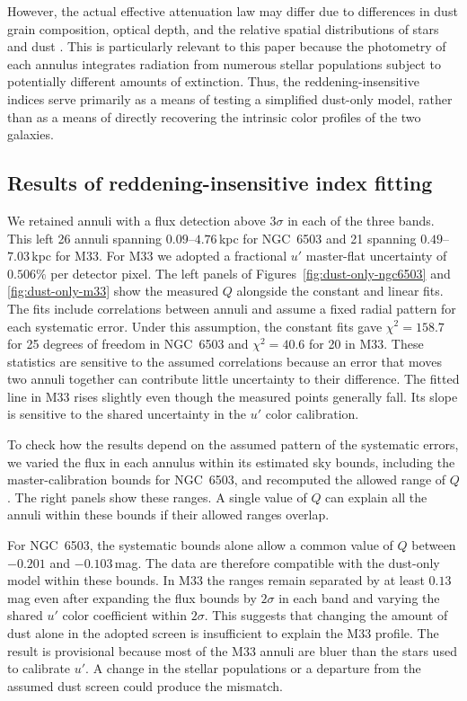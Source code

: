 However, the actual effective attenuation law may differ due to differences in dust grain composition, optical depth, and the relative spatial distributions of stars and dust \cite{SalimNarayanan2020}. This is particularly relevant to this paper because the photometry of each annulus integrates radiation from numerous stellar populations subject to potentially different amounts of extinction. Thus, the reddening-insensitive indices serve primarily as a means of testing a simplified dust-only model, rather than as a means of directly recovering the intrinsic color profiles of the two galaxies.

\subsection{Results of reddening-insensitive index fitting}
\label{sec:dust-only-results}

We retained annuli with a flux detection above $3\sigma$ in each of the three bands. This left 26 annuli spanning $0.09$--$4.76$\,kpc for NGC~6503 and 21 spanning $0.49$--$7.03$\,kpc for M33. For M33 we adopted a fractional $u'$ master-flat uncertainty of $0.506\%$ per detector pixel. The left panels of Figures~\ref{fig:dust-only-ngc6503} and \ref{fig:dust-only-m33} show the measured $Q$ alongside the constant and linear fits. The fits include correlations between annuli and assume a fixed radial pattern for each systematic error. Under this assumption, the constant fits gave $\chi^2=158.7$ for 25 degrees of freedom in NGC~6503 and $\chi^2=40.6$ for 20 in M33. These statistics are sensitive to the assumed correlations because an error that moves two annuli together can contribute little uncertainty to their difference. The fitted line in M33 rises slightly even though the measured points generally fall. Its slope is sensitive to the shared uncertainty in the $u'$ color calibration.

To check how the results depend on the assumed pattern of the systematic errors, we varied the flux in each annulus within its estimated sky bounds, including the master-calibration bounds for NGC~6503, and recomputed the allowed range of $Q$. The right panels show these ranges. A single value of $Q$ can explain all the annuli within these bounds if their allowed ranges overlap.

For NGC~6503, the systematic bounds alone allow a common value of $Q$ between $-0.201$ and $-0.103$\,mag. The data are therefore compatible with the dust-only model within these bounds. In M33 the ranges remain separated by at least $0.13$\,mag even after expanding the flux bounds by $2\sigma$ in each band and varying the shared $u'$ color coefficient within $2\sigma$. This suggests that changing the amount of dust alone in the adopted screen is insufficient to explain the M33 profile. The result is provisional because most of the M33 annuli are bluer than the stars used to calibrate $u'$. A change in the stellar populations or a departure from the assumed dust screen could produce the mismatch.

